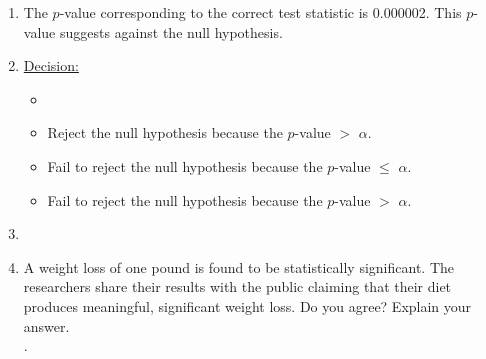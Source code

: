 \begin{enumerate}
\begin{enumerate}
\begin{enumerate}
\item   The $p$-value corresponding to the correct test statistic is 0.000002. This $p$-value suggests \underline{} against the null hypothesis.
\item  \underline{Decision:}
\begin{itemize}
\item {}
\item Reject the null hypothesis because the $p$-value $>$ $\alpha$.
\item Fail to reject the null hypothesis because the $p$-value $\leq$ $\alpha$.
\item Fail to reject the null hypothesis because the $p$-value $>$ $\alpha$.
\end{itemize}
\item[]
\item   A weight loss of one pound is found to be statistically significant. The researchers share their results with the public claiming that their diet produces meaningful, significant weight loss. Do you agree? Explain your answer.\\
\emph{}.

\end{enumerate}
\end{enumerate}
\end{enumerate}